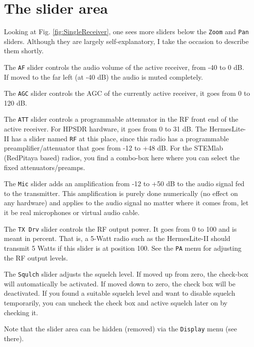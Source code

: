 \documentclass[12pt]{book}
\def\rett#1{\texttt{\color{red}#1}}
\def\bltt#1{\texttt{\color{blue}#1}}
\begin{document}
\section{The slider area}
\label{sec:SliderArea}
Looking at Fig. \ref{fig:SingleReceiver}, one sees more sliders below the \rett{Zoom} and \rett{Pan}
sliders. Although they are largely self-explanatory, I take the occasion to describe them shortly.

The \rett{AF} slider controls the audio volume of the active receiver, from -40 to 0 dB. If moved to the
far left (at -40 dB) the audio is muted completely.

The \rett{AGC} slider controls the AGC of the currently active receiver, it goes from 0 to 120 dB.

The \rett{ATT} slider controls a programmable attenuator in the RF front end of the active receiver. For
HPSDR hardware, it goes from 0 to 31 dB. The HermesLite-II has a slider named \rett{RF} at this place,
since this radio has a programmable preamplifier/attenuator that goes from -12 to +48 dB. For the STEMlab
(RedPitaya based) radios, you find a combo-box here where you can select the fixed attenuators/preamps.

The \rett{Mic} slider adds an amplification from -12 to +50 dB to the audio signal fed to the transmitter.
This amplification is purely done numerically (no effect on any hardware) and applies to the audio signal
no matter where it comes from, let it be real microphones or virtual audio cable.

The \rett{TX Drv} slider controls the RF output power. It goes from 0 to 100 and is meant in percent. That is,
a 5-Watt radio such as the HermesLite-II should transmit 5 Watts if this slider is at position 100. See the
\bltt{PA} menu for adjusting the RF output levels.

The \rett{Squlch} slider adjusts the squelch level. If moved up from zero, the check-box will automatically
be activated. If moved down to zero, the check box will be deactivated. If you found a suitable squelch
level and want to disable squelch temporarily, you can uncheck the check box and active squelch later
on by checking it.

Note that the slider area can be hidden (removed) via the \bltt{Display} menu (see there).
\end{document}
